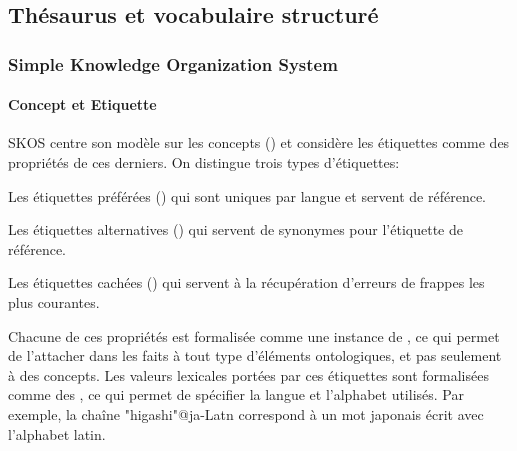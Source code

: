 \subsection{Thésaurus et vocabulaire structuré}\label{sec:thesaurus}
\subsubsection{Simple Knowledge Organization System}\label{sec:skos}

\paragraph{Concept et Etiquette}
SKOS centre son modèle sur les concepts () et considère les étiquettes comme des propriétés de ces derniers. 
On distingue trois types d'étiquettes: 
\begin{liste} 
	\item Les étiquettes préférées () qui sont uniques par langue et servent de référence.
	\item Les étiquettes alternatives () qui servent de synonymes pour l'étiquette de référence. 
	\item Les étiquettes cachées () qui servent à la récupération d'erreurs de frappes les plus courantes. 
\end{liste}
Chacune de ces propriétés est formalisée comme une instance de , ce qui permet de l'attacher dans les faits à tout type d'éléments ontologiques, et pas seulement à des concepts. 
Les valeurs lexicales portées par ces étiquettes sont formalisées comme des , ce qui permet de spécifier la langue et l'alphabet utilisés. 
Par exemple, la chaîne "higashi"@ja-Latn correspond à un mot japonais écrit avec l'alphabet latin.

